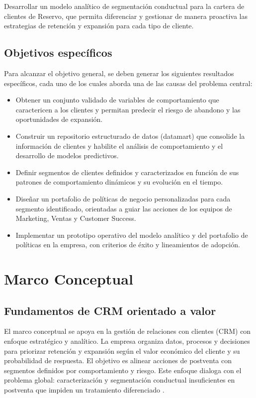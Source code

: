 Desarrollar un modelo analítico de segmentación conductual para la cartera de clientes de Reservo, que permita diferenciar y gestionar de manera proactiva las estrategias de retención y expansión para cada tipo de cliente.

\subsection{Objetivos específicos}

Para alcanzar el objetivo general, se deben generar los siguientes resultados específicos, cada uno de los cuales aborda una de las causas del problema central:

\begin{itemize}
    \item Obtener un conjunto validado de variables de comportamiento que caractericen a los clientes y permitan predecir el riesgo de abandono y las oportunidades de expansión.
    
    \item Construir un repositorio estructurado de datos (datamart) que consolide la información de clientes y habilite el análisis de comportamiento y el desarrollo de modelos predictivos.
    
    \item Definir segmentos de clientes definidos y caracterizados en función de sus patrones de comportamiento dinámicos y su evolución en el tiempo.
    
    \item Diseñar un portafolio de políticas de negocio personalizadas para cada segmento identificado, orientadas a guiar las acciones de los equipos de Marketing, Ventas y Customer Success.

    \item Implementar un prototipo operativo del modelo analítico y del portafolio de políticas en la empresa, con criterios de éxito y lineamientos de adopción.

\end{itemize}

\section{Marco Conceptual}

\subsection{Fundamentos de CRM orientado a valor}
El marco conceptual se apoya en la gestión de relaciones con clientes (CRM) con enfoque estratégico y analítico. La empresa organiza datos, procesos y decisiones para priorizar retención y expansión según el valor económico del cliente y su probabilidad de respuesta. El objetivo es alinear acciones de postventa con segmentos definidos por comportamiento y riesgo. Este enfoque dialoga con el problema global: caracterización y segmentación conductual insuficientes en postventa que impiden un tratamiento diferenciado \citep{Kumar2010}.

